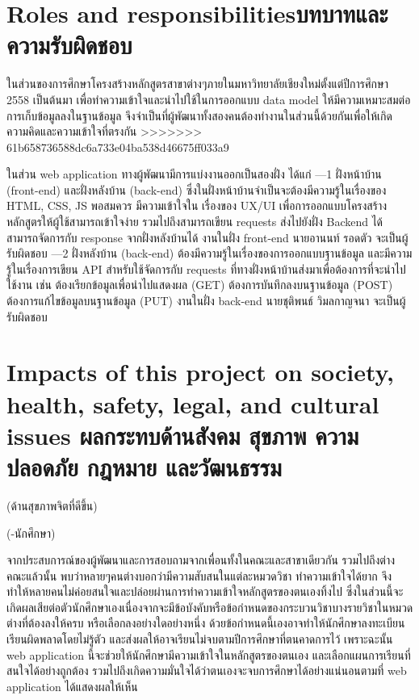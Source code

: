 \section{\ifenglish Roles and responsibilities\else บทบาทและความรับผิดชอบ\fi}
{ในส่วนของการศึกษาโครงสร้างหลักสูตรสาขาต่างๆภายในมหาวิทยาลัยเชียงใหม่ตั้งแต่ปีการศึกษา 2558 เป็นต้นมา เพื่อทำความเข้าใจและนําไปใช้ในการออกแบบ data model ให้มีความเหมาะสมต่อการเก็บข้อมูลลงในฐานข้อมูล จึงจำเป็นที่ผู้พัฒนาทั้งสองคนต้องทำงานในส่วนนี้ด้วยกันเพื่อให้เกิดความคิดและความเข้าใจที่ตรงกัน }
>>>>>>> 61b658736588dc6a733e04ba538d46675ff033a9

{ในส่วน web application ทางผู้พัฒนามีการแบ่งงานออกเป็นสองฝั่ง ได้แก่ }
{---1 ฝั่งหน้าบ้าน (front-end) และฝั่งหลังบ้าน (back-end) ซึ่งในฝั่งหน้าบ้านจําเป็นจะต้องมีความรู้ในเรื่องของ HTML, CSS, JS พอสมควร มีความเข้าใจใน เรื่องของ UX/UI เพื่อการออกแบบโครงสร้างหลักสูตรให้ผู้ใช้สามารถเข้าใจง่าย รวมไปถึงสามารถเขียน requests ส่งไปยังฝั่ง Backend ได้ สามารถจัดการกับ response จากฝั่งหลังบ้านได้ งานในฝั่ง front-end นายอานนท์ รอดตัว จะเป็นผู้รับผิดชอบ}
{---2 ฝั่งหลังบ้าน (back-end) ต้องมีความรู้ในเรื่องของการออกแบบฐานข้อมูล และมีความรู้ในเรื่องการเขียน API สําหรับใช้จัดการกับ requests ที่ทางฝั่งหน้าบ้านส่งมาเพื่อต้องการที่จะนําไปใช้งาน เช่น ต้องเรียกข้อมูลเพื่อนำไปแสดงผล (GET) ต้องการบันทึกลงบนฐานข้อมูล (POST) ต้องการแก้ไขข้อมูลบนฐานข้อมูล (PUT) งานในฝั่ง back-end นายชุติพนธ์ วิมลกาญจนา จะเป็นผู้รับผิดชอบ}
\section{\ifenglish%
Impacts of this project on society, health, safety, legal, and cultural issues
\else%
ผลกระทบด้านสังคม สุขภาพ ความปลอดภัย กฎหมาย และวัฒนธรรม\fi}

{(ด้านสุขภาพจิตที่ดีขึ้น) }

{(-นักศึกษา)}

{จากประสบการณ์ของผู้พัฒนาและการสอบถามจากเพื่อนทั้งในคณะและสาขาเดียวกัน รวมไปถึงต่างคณะแล้วนั้น พบว่าหลายๆคนต่างบอกว่ามีความสับสนในแต่ละหมวดวิชา ทำความเข้าใจได้ยาก จึงทำให้หลายคนไม่ค่อยสนใจและปล่อยผ่านการทำความเข้าใจหลักสูตรของตนเองทิ้งไป  ซึ่งในส่วนนี้จะเกิดผลเสียต่อตัวนักศึกษาเองเนื่องจากจะมีข้อบังคับหรือข้อกำหนดของกระบวนวิชาบางรายวิชาในหมวดต่างที่ต้องลงให้ครบ หรือเลือกลงอย่างใดอย่างหนึ่ง ด้วยข้อกำหนดนี้เองอาจทำให้นักศึกษาลงทะเบียนเรียนผิดพลาดโดยไม่รู้ตัว และส่งผลให้อาจเรียนไม่จบตามปีการศึกษาที่ตนคาดการไว้ เพราะฉะนั้น web application นี้จะช่วยให้นักศึกษามีความเข้าใจในหลักสูตรของตนเอง และเลือกแผนการเรียนที่สนใจได้อย่างถูกต้อง รวมไปถึงเกิดความมั่นใจได้ว่าตนเองจะจบการศึกษาได้อย่างแน่นอนตามที่ web application ได้แสดงผลให้เห็น  }


